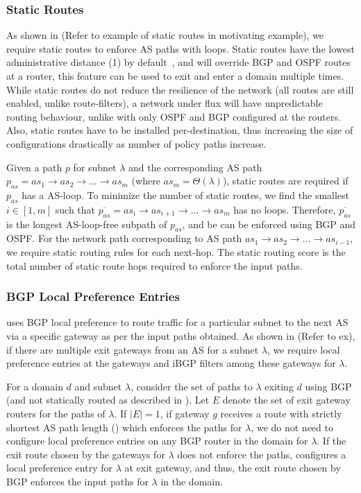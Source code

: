 \subsubsection{Static Routes} \label{sec:static}
As shown in \Cref{} (Refer to example of 
static routes in motivating example), we require static routes 
to enforce AS paths with loops. Static routes have the lowest 
administrative distance (1) by default~\cite{ad}, and will override BGP
and OSPF routes at a router, this feature can be used to 
exit and enter a domain multiple times. While static routes
do not reduce the resilience of the network (all routes are still
enabled, unlike route-filters), a network under flux will have
unpredictable routing behaviour, unlike with only OSPF and BGP
configured at the routers. 
Also, static routes have to be installed per-destination, thus increasing
the size of configurations drastically as number of policy paths increase.

Given a path $p$ for subnet $\lambda$ and 
the corresponding AS path $p_{as}
= as_1 \rightarrow as_2 \rightarrow \ldots \rightarrow as_m$ (where
$as_m = \Theta(\lambda)$), static
routes are required if $p_{as}$ has a AS-loop. 
To minimize
the number of static routes, we find 
the smallest $i \in [1,m]$ 
such that $\overline{p_{as}} = as_i \rightarrow as_{i+1}
\rightarrow \ldots \rightarrow as_m$ has no loops. 
Therefore, $\overline{p_{as}}$ is the longest AS-loop-free
subpath of $p_{as}$, and be can be enforced using BGP and OSPF. For the 
network path corresponding to AS path $as_1 \rightarrow as_2 
\rightarrow \ldots \rightarrow as_{i-1}$, we require static
routing rules for each next-hop. The static routing score
is the total number of static route hops required to enforce
the input paths.

\subsubsection{BGP Local Preference Entries}
\name uses BGP local preference to route traffic
for a particular subnet to the next AS via a specific 
gateway as per the input paths obtained. 
As shown in \Cref{} (Refer
to ex), if there are multiple exit gateways from an AS 
for a subnet $\lambda$, we require local preference entries at the 
gateways and iBGP filters among these gateways for $\lambda$.

For a domain $d$ and subnet $\lambda$, consider the set 
of paths to $\lambda$ exiting $d$ using BGP (and not statically
routed as described in ). Let $E$ denote the
set of exit gateway routers for the paths of $\lambda$. 
If $|E| = 1$, if gateway $g$ receives a route with 
strictly shortest AS path length () 
which enforces the paths
for $\lambda$, we do not need to configure local preference
entries on any BGP router in the domain for $\lambda$. If
the exit route chosen by the gateways for $\lambda$ does not 
enforce the paths, \name configures a local preference entry
for $\lambda$ at exit gateway, and thus, the exit route chosen
by BGP enforces the input paths for $\lambda$ in the domain.

